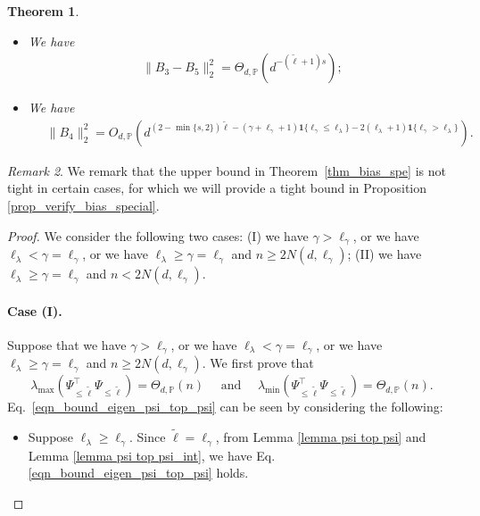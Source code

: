 \documentclass{article}
\theoremstyle{plain}
\newtheorem{theorem}{Theorem}[section]
\theoremstyle{definition}
\theoremstyle{remark}
\newtheorem{remark}[theorem]{Remark}
\begin{document}
\begin{appendix}
\begin{theorem}
\begin{itemize}
\item[(iv)] We have
\begin{equation*}
    \begin{aligned}
                \|B_3-B_5\|_{2}^{2} 
        =
        \Theta_{d, \mathbb{P}} \left( d^{-(\tilde{\ell}+1)s}\right);
    \end{aligned}
\end{equation*}

\item[(v)] We have
\begin{equation*}
    \begin{aligned}
                &~\|B_4\|_{2}^{2} = O_{d, \mathbb{P}} \left(  d^{(2-\min\{s, 2\})\tilde{\ell} - (\gamma  + \ell_{\gamma} + 1)\mathbf{1}\{\ell_{\gamma} \leq \ell_{\lambda}\} - 2(\ell_{\lambda}+1)\mathbf{1}\{\ell_{\gamma} > \ell_{\lambda}\} } \right).
    \end{aligned}
\end{equation*}
\end{itemize}
\end{theorem}

    \begin{remark}
        We remark that the upper bound in Theorem~\ref{thm_bias_spe} is not tight in certain cases, for which we will provide a tight bound in Proposition \ref{prop_verify_bias_special}.
    \end{remark}
    
\begin{proof}
We consider the following two cases: (I) we have $\gamma > \ell_{\gamma}$, or we have $\ell_{\lambda} < \gamma = \ell_{\gamma}$, or we have $\ell_{\lambda} \geq \gamma = \ell_{\gamma}$ and $n \geq 2N(d, \ell_{\gamma})$;
(II) we have $\ell_{\lambda} \geq \gamma = \ell_{\gamma}$ and $n < 2N(d, \ell_{\gamma})$.

\paragraph{Case (I). } Suppose that we have $\gamma > \ell_{\gamma}$, or we have $\ell_{\lambda} < \gamma = \ell_{\gamma}$, or we have $\ell_{\lambda} \geq \gamma = \ell_{\gamma}$ and $n \geq 2N(d, \ell_{\gamma})$. 
We first prove that \begin{equation}\label{eqn_bound_eigen_psi_top_psi}
    \lambda_{\text{max}}(\Psi_{\leq \tilde{\ell}}^{\top}\Psi_{\leq \tilde{\ell}}) = \Theta_{d, \mathbb{P}}(n) \quad \text{ and } \quad \lambda_{\text{min}}(\Psi_{\leq \tilde{\ell}}^{\top}\Psi_{\leq \tilde{\ell}}) = \Theta_{d, \mathbb{P}}(n).
\end{equation}
Eq.~\eqref{eqn_bound_eigen_psi_top_psi} can be seen by considering the following: 
\begin{itemize}
    \item Suppose $\ell_{\lambda} \geq \ell_{\gamma}$. Since $\tilde{\ell}=\ell_{\gamma}$, from Lemma \ref{lemma psi top psi} and Lemma \ref{lemma psi top psi_int}, we have Eq. \eqref{eqn_bound_eigen_psi_top_psi} holds. 


\end{itemize}
\end{proof}
\end{appendix}
\end{document}
